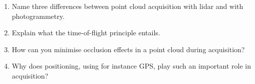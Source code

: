 \begin{enumerate}
	\item Name three differences between point cloud acquisition with lidar and with photogrammetry.
	\item Explain what the time-of-flight principle entails.
	\item How can you minimise occlusion effects in a point cloud during acquisition?
	\item Why does positioning, using for instance GPS, play such an important role in acquisition?
\end{enumerate}
